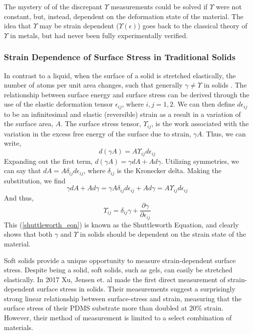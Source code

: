 The mystery of of the discrepant $ \Upsilon $ measurements could be solved if $ \Upsilon $ were not constant, but, instead, dependent on the deformation state of the material. The idea that $ \Upsilon $ may be strain dependent ($ \Upsilon(\epsilon) $) goes back to the classical theory of $ \Upsilon $ in metals, but had never been fully experimentally verified. 

\subsubsection{Strain Dependence of Surface Stress in Traditional Solids}
In contrast to a liquid, when the surface of a solid is stretched elastically, the number of atoms per unit area changes, such that generally $ \gamma \neq \Upsilon$ in solids \cite{cammarata1994surface}. The relationship between surface energy and surface stress can be derived through the use of the elastic deformation tensor $\epsilon_{ij}$, where $i,j=1,2$. We can then define $d\epsilon_{ij}$ to be an infinitesimal and elastic (reversible) strain as a result in a variation of the surface area, $A$. The surface stress tensor, $\Upsilon_{ij}$, is the work associated with the variation in the excess free energy of the surface due to strain, $\gamma A$. Thus, we can write, \[d(\gamma A) = A \Upsilon_{ij} d\epsilon_{ij}\] Expanding out the first term, $d(\gamma A) = \gamma dA + A d\gamma$. Utilizing symmetries, we can say that $dA = A \delta_{ij} d\epsilon_{ij}$, where $\delta_{ij}$ is the Kronecker delta. Making the substitution, we find \[\gamma dA + A d\gamma = \gamma A \delta_{ij} d\epsilon_{ij} + A d\gamma = A \Upsilon_{ij} d\epsilon_{ij}\] And thus,
\begin{equation}
\label{shuttleworth_eqn}
\Upsilon_{ij} = \delta_{ij}\gamma + \frac{\partial \gamma}{\partial \epsilon_{ij}} 
\end{equation}
This (\ref{shuttleworth_eqn}) is known as the Shuttleworth Equation, and clearly shows that both $\gamma$ and $\Upsilon$ in solids should be dependent on the strain state of the material.

Soft solids provide a unique opportunity to measure strain-dependent surface stress. Despite being a solid, soft solids, such as gels, can easily be stretched elastically. In 2017 Xu, Jensen et. al \cite{xu2017direct} made the first direct measurement of strain-dependent surface stress in solids. Their measurements suggest a surprisingly strong linear relationship between surface-stress and strain, measuring that the surface stress of their PDMS substrate more than doubled at 20\% strain. However, their method of measurement is limited to a select combination of materials. 

